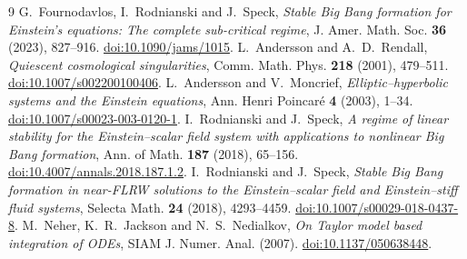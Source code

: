 \documentclass[11pt,a4paper]{article}
\theoremstyle{remark}
\begin{document}
\begin{thebibliography}{9}
 G.~Fournodavlos, I.~Rodnianski and J.~Speck, \emph{Stable Big Bang formation for Einstein's equations: The complete sub-critical regime}, J. Amer. Math. Soc. \textbf{36} (2023), 827--916. \href{https://doi.org/10.1090/jams/1015}{doi:10.1090/jams/1015}.
 L.~Andersson and A.~D.~Rendall, \emph{Quiescent cosmological singularities}, Comm. Math. Phys. \textbf{218} (2001), 479--511. \href{https://doi.org/10.1007/s002200100406}{doi:10.1007/s002200100406}.
 L.~Andersson and V.~Moncrief, \emph{Elliptic--hyperbolic systems and the Einstein equations}, Ann. Henri Poincar\'e \textbf{4} (2003), 1--34. \href{https://doi.org/10.1007/s00023-003-0120-1}{doi:10.1007/s00023-003-0120-1}.
 I.~Rodnianski and J.~Speck, \emph{A regime of linear stability for the Einstein--scalar field system with applications to nonlinear Big Bang formation}, Ann. of Math. \textbf{187} (2018), 65--156. \href{https://doi.org/10.4007/annals.2018.187.1.2}{doi:10.4007/annals.2018.187.1.2}.
 I.~Rodnianski and J.~Speck, \emph{Stable Big Bang formation in near-FLRW solutions to the Einstein--scalar field and Einstein--stiff fluid systems}, Selecta Math. \textbf{24} (2018), 4293--4459. \href{https://doi.org/10.1007/s00029-018-0437-8}{doi:10.1007/s00029-018-0437-8}.
 M.~Neher, K.~R.~Jackson and N.~S.~Nedialkov, \emph{On Taylor model based integration of ODEs}, SIAM J. Numer. Anal. (2007). \href{https://doi.org/10.1137/050638448}{doi:10.1137/050638448}.
\end{thebibliography}
\end{document}
